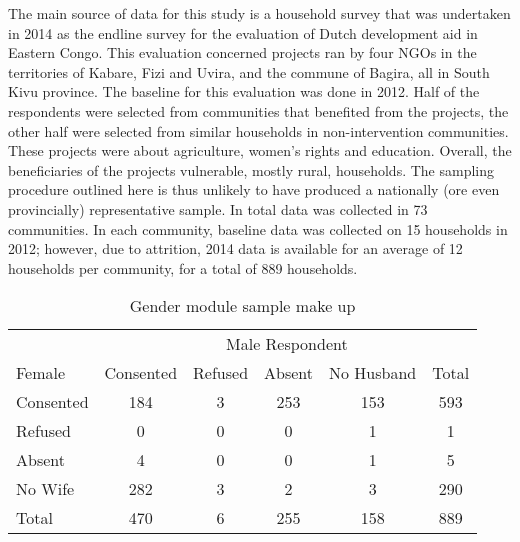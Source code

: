 \documentclass[10pt,a4paper]{scrartcl} %
\newcommand{\tableloc}{C:/Users/Koen/Dropbox/PhD/Papers/CongoGBV/Tables}
\begin{document}
\newcommand{\summstat}[2]{\csvreader[filter strcmp={\var}{#1}]{\tableloc/balance.csv}{var=\var,#2=\stat}{\stat}}
The main source of data for this study is a household survey that was undertaken in 2014 as the endline survey for the evaluation of Dutch development aid in Eastern Congo. This evaluation concerned projects ran by four NGOs in the territories of Kabare, Fizi and Uvira, and the commune of Bagira, all in South Kivu province. The baseline for this evaluation was done in 2012. Half of the respondents were selected from communities that benefited from the projects, the other half were selected from similar households in non-intervention communities. These projects were about agriculture, women's rights and education. Overall, the beneficiaries of the projects vulnerable, mostly rural, households. The sampling procedure outlined here is thus unlikely to have produced a nationally (ore even provincially) representative sample. In total data was collected in 73 communities. In each community, baseline data was collected on 15 households in 2012; however, due to attrition, 2014 data is available for an average of 12 households per community, for a total of 889 households. 

\begin{table}[htb]
	\centering
	\caption{Gender module sample make up}
	\label{tab:bargsample}
	\begin{tabular}{l c c c c c}
		\toprule
		& \multicolumn{5}{c}{Male Respondent} \\
Female&Consented&Refused&Absent&No Husband&Total \\
\hline
Consented&184&3&253&153&593 \\
Refused&0&0&0&1&1 \\
Absent&4&0&0&1&5 \\
No Wife&282&3&2&3&290 \\
Total&470&6&255&158&889 \\
\bottomrule
	\end{tabular}
\end{table}
\end{document}
